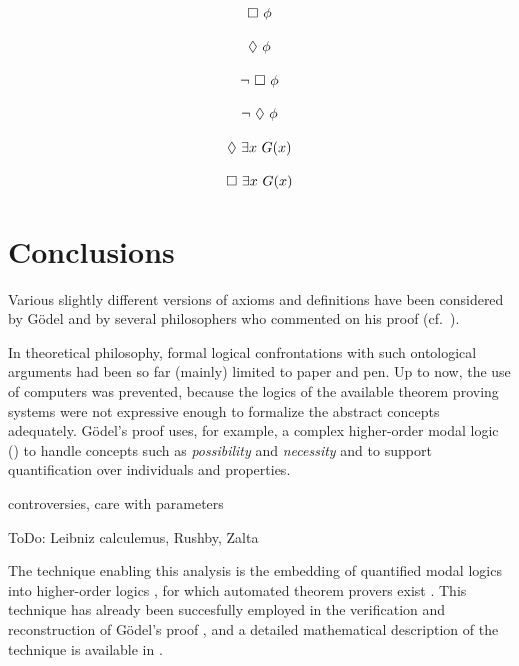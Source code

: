 \documentclass{birkjour}
\theoremstyle{definition}
\newtheorem{defn}[thm]{Definition}
\theoremstyle{remark}
\numberwithin{equation}{section}
\def\HOML{\entity{HOML}\xspace}
\begin{document}
\clearpage


\begin{Huge}

$$
\Box \ \phi
$$


$$
\Diamond \ \phi
$$

$$
\neg \ \Box \ \phi
$$

$$
\neg \ \Diamond \ \phi
$$

$$
\Diamond \ \exists x \ G(x)
$$

$$
\Box \ \exists x \ G(x)
$$

\end{Huge}

\clearpage



\section{Conclusions}


Various slightly different versions of
axioms and definitions have been considered by G\"{o}del and by
several philosophers who commented on his proof
(cf.~\cite{sobel2004logic,anderson90:_some_emend_of_goedel_ontol_proof,AndersonGettings,Fitting,Adams,ContemporaryBibliography}).



In theoretical philosophy, formal logical confrontations with such
ontological arguments had been so far (mainly) limited to paper
and pen.  Up to now, the use of computers was prevented, because the
logics of the available theorem proving systems were not expressive
enough to formalize the abstract concepts adequately. G{\"o}del's proof
uses, for example, a complex higher-order modal logic (\HOML) to handle
concepts such as \emph{possibility} and \emph{necessity} and to support
quantification over individuals and properties.

controversies, care with parameters

ToDo: Leibniz calculemus, Rushby, Zalta \cite{oppenheimera11,rushby13}

The technique enabling this analysis is the embedding of quantified modal logics into higher-order logics \cite{J23,B9,C36}, for which automated theorem provers exist \cite{ToDo:leo,sattalax,isabelle,coq}. This technique has already been succesfully employed in the verification and reconstruction of G\"odel's proof \cite{todo:all our previous papers}, and a detailed mathematical description of the technique is available in \cite{todo:ECAI}.


\end{document}
